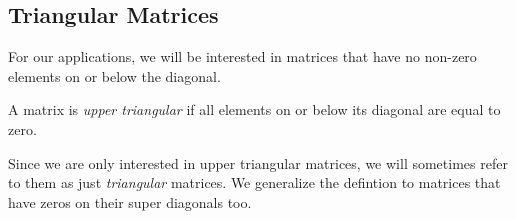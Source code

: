 \subsection{Triangular Matrices}
For our applications, we will be interested in matrices that have no non-zero elements on or below the diagonal.
\begin{Definition}
  A matrix is \emph{upper triangular} if all elements on or below its diagonal are equal to zero.
\end{Definition}
Since we are only interested in upper triangular matrices, we will sometimes refer to them as just \emph{triangular} matrices. We generalize the defintion to matrices that have zeros on their super diagonals too.


